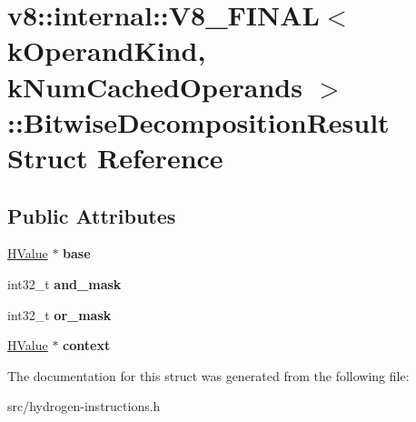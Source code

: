 \hypertarget{structv8_1_1internal_1_1_v8___f_i_n_a_l_1_1_bitwise_decomposition_result}{}\section{v8\+:\+:internal\+:\+:V8\+\_\+\+F\+I\+N\+A\+L$<$ k\+Operand\+Kind, k\+Num\+Cached\+Operands $>$\+:\+:Bitwise\+Decomposition\+Result Struct Reference}
\label{structv8_1_1internal_1_1_v8___f_i_n_a_l_1_1_bitwise_decomposition_result}
\subsection*{Public Attributes}
\begin{DoxyCompactItemize}
\item 
\hypertarget{structv8_1_1internal_1_1_v8___f_i_n_a_l_1_1_bitwise_decomposition_result_a7e8ccd6e8a7c164dde97995628c37af2}{}\hyperlink{classv8_1_1internal_1_1_h_value}{H\+Value} $\ast$ {\bfseries base}\label{structv8_1_1internal_1_1_v8___f_i_n_a_l_1_1_bitwise_decomposition_result_a7e8ccd6e8a7c164dde97995628c37af2}

\item 
\hypertarget{structv8_1_1internal_1_1_v8___f_i_n_a_l_1_1_bitwise_decomposition_result_a9c1a0b0b6126cf8ef25598983918fcc7}{}int32\+\_\+t {\bfseries and\+\_\+mask}\label{structv8_1_1internal_1_1_v8___f_i_n_a_l_1_1_bitwise_decomposition_result_a9c1a0b0b6126cf8ef25598983918fcc7}

\item 
\hypertarget{structv8_1_1internal_1_1_v8___f_i_n_a_l_1_1_bitwise_decomposition_result_a5032ea7c2a4560fde68dcfe4ac5b1214}{}int32\+\_\+t {\bfseries or\+\_\+mask}\label{structv8_1_1internal_1_1_v8___f_i_n_a_l_1_1_bitwise_decomposition_result_a5032ea7c2a4560fde68dcfe4ac5b1214}

\item 
\hypertarget{structv8_1_1internal_1_1_v8___f_i_n_a_l_1_1_bitwise_decomposition_result_a5e516207eafbc1b5e0ea3a4bf62e3039}{}\hyperlink{classv8_1_1internal_1_1_h_value}{H\+Value} $\ast$ {\bfseries context}\label{structv8_1_1internal_1_1_v8___f_i_n_a_l_1_1_bitwise_decomposition_result_a5e516207eafbc1b5e0ea3a4bf62e3039}

\end{DoxyCompactItemize}


The documentation for this struct was generated from the following file\+:\begin{DoxyCompactItemize}
\item 
src/hydrogen-\/instructions.\+h\end{DoxyCompactItemize}
